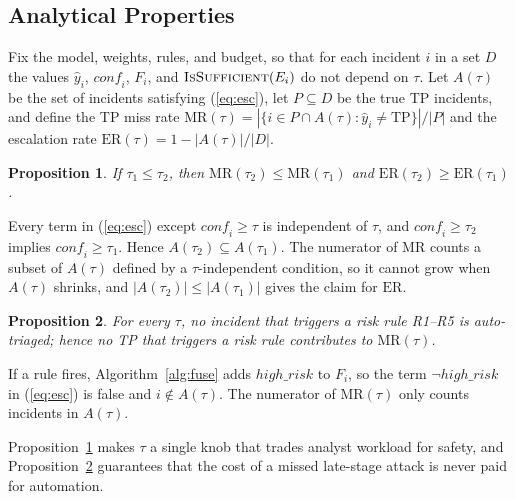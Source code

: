\documentclass[conference]{IEEEtran}
\newtheorem{proposition}{Proposition}
\begin{document}
\subsection{Analytical Properties}
Fix the model, weights, rules, and budget, so that for each incident
$i$ in a set $D$ the values $\hat{y}_i$, $\mathit{conf}_i$, $F_i$, and
$\textsc{IsSufficient}(E_i)$ do not depend on $\tau$. Let $A(\tau)$ be
the set of incidents satisfying (\ref{eq:esc}), let $P\subseteq D$ be
the true TP incidents, and define the TP miss rate
$\mathrm{MR}(\tau)=|\{i\in P\cap A(\tau):\hat{y}_i\neq\mathrm{TP}\}|/|P|$
and the escalation rate $\mathrm{ER}(\tau)=1-|A(\tau)|/|D|$.

\begin{proposition}\label{prop:mono}
If $\tau_1\le\tau_2$, then $\mathrm{MR}(\tau_2)\le\mathrm{MR}(\tau_1)$
and $\mathrm{ER}(\tau_2)\ge\mathrm{ER}(\tau_1)$.
\end{proposition}
\begin{IEEEproof}
Every term in (\ref{eq:esc}) except $\mathit{conf}_i\ge\tau$ is
independent of $\tau$, and $\mathit{conf}_i\ge\tau_2$ implies
$\mathit{conf}_i\ge\tau_1$. Hence $A(\tau_2)\subseteq A(\tau_1)$. The
numerator of $\mathrm{MR}$ counts a subset of $A(\tau)$ defined by a
$\tau$-independent condition, so it cannot grow when $A(\tau)$ shrinks,
and $|A(\tau_2)|\le|A(\tau_1)|$ gives the claim for $\mathrm{ER}$.
\end{IEEEproof}

\begin{proposition}\label{prop:safe}
For every $\tau$, no incident that triggers a risk rule R1--R5 is
auto-triaged; hence no TP that triggers a risk rule contributes to
$\mathrm{MR}(\tau)$.
\end{proposition}
\begin{IEEEproof}
If a rule fires, Algorithm~\ref{alg:fuse} adds $\mathit{high\_risk}$
to $F_i$, so the term $\neg\mathit{high\_risk}$ in (\ref{eq:esc}) is
false and $i\notin A(\tau)$. The numerator of $\mathrm{MR}(\tau)$ only
counts incidents in $A(\tau)$.
\end{IEEEproof}

Proposition~\ref{prop:mono} makes $\tau$ a single knob that trades
analyst workload for safety, and Proposition~\ref{prop:safe}
guarantees that the cost of a missed late-stage attack is never paid
for automation.

\end{document}
